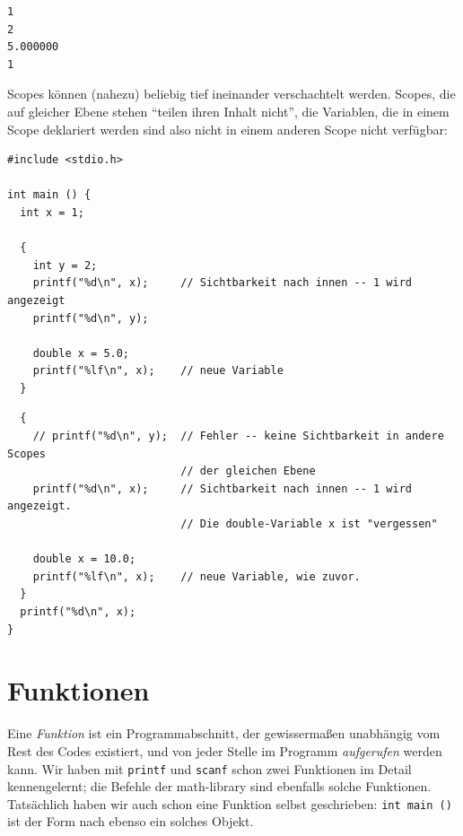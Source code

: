 \begin{cmdbox}
\begin{verbatim}
1
2
5.000000
1
\end{verbatim}
\end{cmdbox}

Scopes können (nahezu) beliebig tief ineinander verschachtelt werden.
Scopes, die auf gleicher Ebene
stehen \enquote{teilen ihren Inhalt nicht}, \ie die Variablen, die in einem Scope deklariert werden sind also nicht in einem anderen Scope nicht verfügbar:

\begin{codebox}
\begin{verbatim}
#include <stdio.h>

int main () {
  int x = 1;

  {
    int y = 2;
    printf("%d\n", x);     // Sichtbarkeit nach innen -- 1 wird angezeigt
    printf("%d\n", y);

    double x = 5.0;
    printf("%lf\n", x);    // neue Variable
  }
\end{verbatim}
\end{codebox}

\begin{codebox}[]
\begin{verbatim}
  {
    // printf("%d\n", y);  // Fehler -- keine Sichtbarkeit in andere Scopes
                           // der gleichen Ebene
    printf("%d\n", x);     // Sichtbarkeit nach innen -- 1 wird angezeigt.
                           // Die double-Variable x ist "vergessen"

    double x = 10.0;
    printf("%lf\n", x);    // neue Variable, wie zuvor.
  }
  printf("%d\n", x);
}
\end{verbatim}
\end{codebox}

\section{Funktionen} \label{sec:funcs}
Eine \emph{Funktion} ist ein Programmabschnitt, der gewissermaßen unabhängig vom Rest des Codes existiert, und von jeder Stelle im Programm \emph{aufgerufen} werden kann. Wir haben mit \texttt{printf} und \texttt{scanf} schon zwei Funktionen im Detail kennengelernt; die Befehle der math-library sind ebenfalls solche Funktionen. Tatsächlich haben wir auch schon eine Funktion selbst geschrieben: \texttt{int main ()} ist der Form nach ebenso ein solches Objekt.

